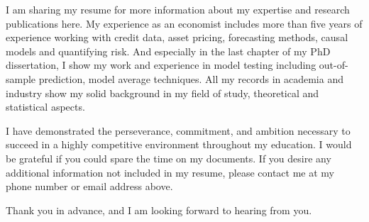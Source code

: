 \documentclass[12pt]{letter} %
\begin{document}
\begin{letter}
I am sharing my resume for more information about my expertise and research publications here. My experience as an economist includes more than five years of experience working with credit data, asset pricing, forecasting methods, causal models and quantifying risk. And especially in the last chapter of my PhD dissertation, I show my work and experience in model testing including out-of-sample prediction, model average techniques. All my records in academia and industry show my solid background in my field of study, theoretical and statistical aspects.


I have demonstrated the perseverance, commitment, and ambition necessary to succeed in a highly competitive environment throughout my education. I would be grateful if you could spare the time on my documents. If you desire any additional information not included in my resume, please contact me at my phone number or email address above.

Thank you in advance, and I am looking forward to hearing from you.





\end{letter}
\end{document}
